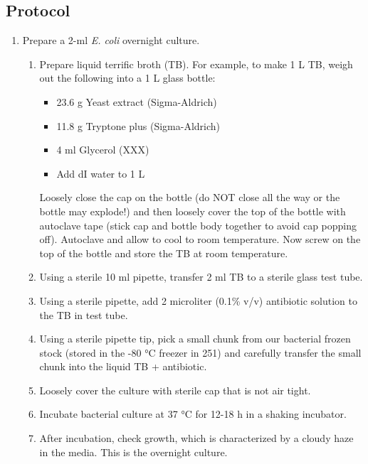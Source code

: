 \subsection{Protocol}

\begin{enumerate}

  \item Prepare a 2-ml \textit{E. coli} overnight culture.

  \begin{enumerate}
    \item Prepare liquid terrific broth (TB). For example, to make 1 L TB, weigh out the following into a 1 L glass bottle:
    \begin{itemize}
      \item 23.6 g Yeast extract (Sigma-Aldrich)
      \item 11.8 g Tryptone plus (Sigma-Aldrich)
      \item 4 ml Glycerol (XXX)
      \item Add dI water to 1 L
    \end{itemize}
    Loosely close the cap on the bottle (do NOT close all the way or the bottle may explode!) and then loosely cover the top of the bottle with autoclave tape (stick cap and bottle body together to avoid cap popping off). Autoclave and allow to cool to room temperature. Now screw on the top of the bottle and store the TB at room temperature.
    \item Using a sterile 10 ml pipette, transfer 2 ml TB to a sterile glass test tube.
    \item Using a sterile pipette, add 2 microliter (0.1\% v/v) antibiotic solution to the TB in test tube.
    \item Using a sterile pipette tip, pick a small chunk from our bacterial frozen stock (stored in the -80 °C freezer in 251) and carefully transfer the small chunk into the liquid TB + antibiotic.
    \item Loosely cover the culture with sterile cap that is not air tight.
    \item Incubate bacterial culture at 37 °C for 12-18 h in a shaking incubator.
    \item After incubation, check growth, which is characterized by a cloudy haze in the media. This is the overnight culture.
  \end{enumerate}


\end{enumerate}
